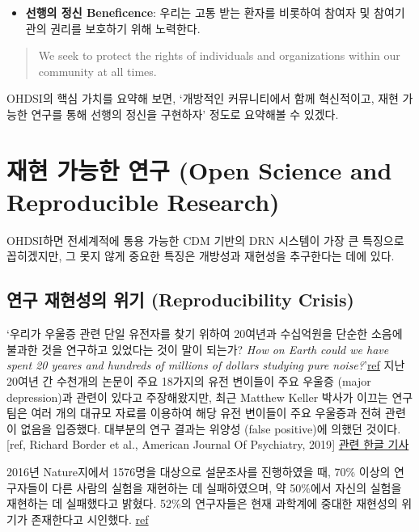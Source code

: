\documentclass[]{book}
\providecommand{\tightlist}{%
  \setlength{\itemsep}{0pt}\setlength{\parskip}{0pt}}
\begin{document}
\begin{itemize}
\tightlist
\item
  \textbf{선행의 정신 Beneficence}: 우리는 고통 받는 환자를 비롯하여 참여자 및 참여기관의 권리를 보호하기 위해 노력한다.
\end{itemize}

\begin{quote}
We seek to protect the rights of individuals and organizations within our community at all times.
\end{quote}

OHDSI의 핵심 가치를 요약해 보면, `개방적인 커뮤니티에서 함께 혁신적이고, 재현 가능한 연구를 통해 선행의 정신을 구현하자' 정도로 요약해볼 수 있겠다.

\hypertarget{ReproducibleResearch}{%
\section{재현 가능한 연구 (Open Science and Reproducible Research)}\label{ReproducibleResearch}}

OHDSI하면 전세계적에 통용 가능한 CDM 기반의 DRN 시스템이 가장 큰 특징으로 꼽히겠지만, 그 못지 않게 중요한 특징은 개방성과 재현성을 추구한다는 데에 있다.

\hypertarget{reproducibility-crisis}{%
\subsection{연구 재현성의 위기 (Reproducibility Crisis)}\label{reproducibility-crisis}}

`우리가 우울증 관련 단일 유전자를 찾기 위하여 20여년과 수십억원을 단순한 소음에 불과한 것을 연구하고 있었다는 것이 말이 되는가? \emph{How on Earth could we have spent 20 yeares and hundreds of millions of dollars studying pure noise?}'\href{https://www.theatlantic.com/science/archive/2019/05/waste-1000-studies/589684/}{ref} 지난 20여년 간 수천개의 논문이 주요 18가지의 유전 변이들이 주요 우울증 (major depression)과 관련이 있다고 주장해왔지만, 최근 Matthew Keller 박사가 이끄는 연구팀은 여러 개의 대규모 자료를 이용하여 해당 유전 변이들이 주요 우울증과 전혀 관련이 없음을 입증했다. 대부분의 연구 결과는 위양성 (false positive)에 의했던 것이다. {[}ref, Richard Border et al., American Journal Of Psychiatry, 2019{]} \href{http://newspeppermint.com/2019/05/20/m-slc6a4/}{관련 한글 기사}

2016년 Nature지에서 1576명을 대상으로 설문조사를 진행하였을 때, 70\% 이상의 연구자들이 다른 사람의 실험을 재현하는 데 실패하였으며, 약 50\%에서 자신의 실험을 재현하는 데 실패했다고 밝혔다. 52\%의 연구자들은 현재 과학계에 중대한 재현성의 위기가 존재한다고 시인했다. \href{https://www.nature.com/news/1-500-scientists-lift-the-lid-on-reproducibility-1.19970}{ref}
\end{document}

